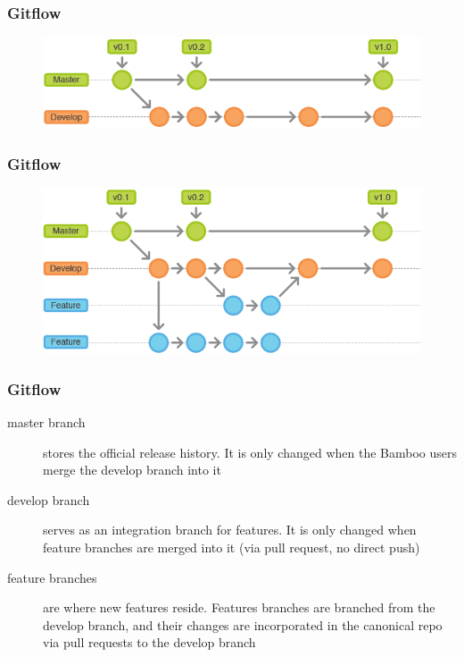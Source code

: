 \documentclass{beamer}
\begin{document}
\begin{frame}
    \frametitle{Gitflow}
    \begin{figure}[h!]
        \begin{center}
            \includegraphics[scale=0.5]{gitflow2.png}
        \end{center}
    \end{figure}
\end{frame}

\begin{frame}
    \frametitle{Gitflow}
    \begin{figure}[h!]
        \begin{center}
            \includegraphics[scale=0.5]{gitflow3.png}
        \end{center}
    \end{figure}
\end{frame}

\begin{frame}
    \frametitle{Gitflow}
    \begin{description}
      \item[master branch] stores the official release history. It is only changed when the Bamboo
          users merge the develop branch into it
      \item[develop branch] serves as an integration branch for features. It is only changed when
          feature branches are merged into it (via pull request, no direct push)
      \item[feature branches] are where new features reside. Features branches are branched from
          the develop branch, and their changes are incorporated in the canonical repo via pull
          requests to the develop branch
    \end{description}
\end{frame}
\end{document}
